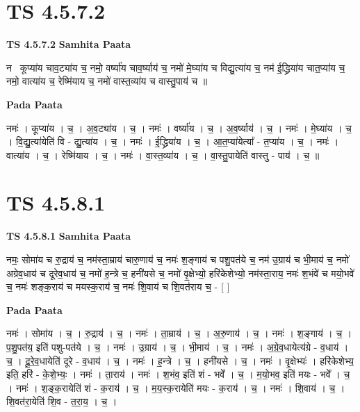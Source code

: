 \documentclass[17pt]{extarticle}
\begin{document}
\section*{ TS 4.5.7.2 }

\textbf{TS 4.5.7.2 } \newline
\textbf{Samhita Paata} \newline

नमः᳡कूप्या॑य चाव॒ट्या॑य च॒ नमो॒ वर्ष्या॑य चाव॒र्ष्याय॑ च॒ नमो॑ मे॒घ्या॑य च विद्यु॒त्या॑य च॒ नम॑ ई॒द्ध्रिया॑य चात॒प्या॑य च॒ नमो॒ वात्या॑य च॒ रेष्मि॑याय च॒ नमो॑ वास्त॒व्या॑य च वास्तु॒पाय॑ च ॥ \newline

\textbf{Pada Paata} \newline

नमः॑ । कूप्या॑य । च॒ । अ॒व॒ट्या॑य । च॒ । नमः॑ । वर्ष्या॑य । च॒ । अ॒व॒र्ष्याय॑ । च॒ । नमः॑ । मे॒घ्या॑य । च॒ । वि॒द्यु॒त्या॑येति॑ वि - द्यु॒त्या॑य । च॒ । नमः॑ । ई॒द्ध्रिया॑य । च॒ । आ॒त॒प्या॑येत्या᳚ - त॒प्या॑य । च॒ । नमः॑ । वात्या॑य । च॒ । रेष्मि॑याय । च॒ । नमः॑ । वा॒स्त॒व्या॑य । च॒ । वा॒स्तु॒पायेति॑ वास्तु - पाय॑ । च॒ ॥  \newline




\section*{ TS 4.5.8.1 }

\textbf{TS 4.5.8.1 } \newline
\textbf{Samhita Paata} \newline

नमः॒ सोमा॑य च रु॒द्राय॑ च॒ नम॑स्ता॒म्राय॑ चारु॒णाय॑ च॒ नमः॑ श॒ङ्गाय॑ च पशु॒पत॑ये च॒ नम॑ उ॒ग्राय॑ च भी॒माय॑ च॒ नमो॑ अग्रेव॒धाय॑ च दूरेव॒धाय॑ च॒ नमो॑ ह॒न्त्रे च॒ हनी॑यसे च॒ नमो॑ वृ॒क्षेभ्यो॒ हरि॑केशेभ्यो॒ नम॑स्ता॒राय॒ नमः॑ श॒भंवे॑ च मयो॒भवे॑ च॒ नमः॑ शङ्क॒राय॑ च मयस्क॒राय॑ च॒ नमः॑ शि॒वाय॑ च शि॒वत॑राय च॒ - [  ] \newline

\textbf{Pada Paata} \newline

नमः॑ । सोमा॑य । च॒ । रु॒द्राय॑ । च॒ । नमः॑ । ता॒म्राय॑ । च॒ । अ॒रु॒णाय॑ । च॒ । नमः॑ । श॒ङ्गाय॑ । च॒ । प॒शु॒पत॑य॒ इति॑ पशु-पत॑ये । च॒ । नमः॑ । उ॒ग्राय॑ । च॒ । भी॒माय॑ । च॒ । नमः॑ । अ॒ग्रे॒व॒धायेत्य॑ग्रे - व॒धाय॑ । च॒ । दू॒रे॒व॒धायेति॑ दूरे - व॒धाय॑ । च॒ । नमः॑ । ह॒न्त्रे । च॒ । हनी॑यसे । च॒ । नमः॑ । वृ॒क्षेभ्यः॑ । हरि॑केशेभ्य॒ इति॒ हरि॑ - के॒शे॒भ्यः॒ । नमः॑ । ता॒राय॑ । नमः॑ । श॒भंव॒ इति॑ शं - भवे᳚ । च॒ । म॒यो॒भव॒ इति॑ मयः - भवे᳚ । च॒ । नमः॑ । श॒ङ्क॒रायेति॑ शं - क॒राय॑ । च॒ । म॒य॒स्क॒रायेति॑ मयः - क॒राय॑ । च॒ । नमः॑ । शि॒वाय॑ । च॒ । शि॒वत॑रा॒येति॑ शि॒व - त॒रा॒य॒ । च॒ ।  \newline
\end{document}
